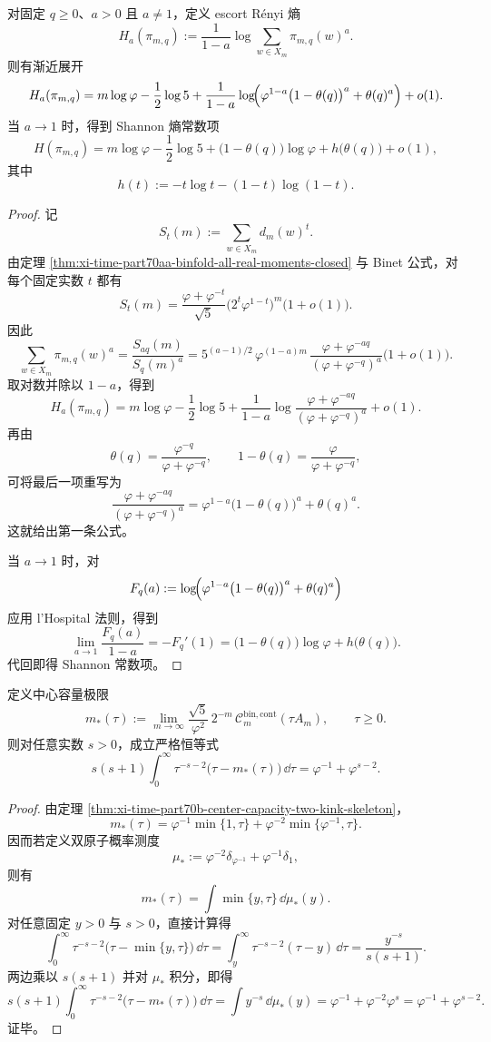 \begin{theorem}\label{thm:xi-time-part70ab-escort-renyi-entropy-full-constant}
对固定 \(q\ge 0\)、\(a>0\) 且 \(a\neq 1\)，定义 escort Rényi 熵
\[
H_a(\pi_{m,q})
:=
\frac{1}{1-a}\log\sum_{w\in X_m}\pi_{m,q}(w)^a.
\]
则有渐近展开
\[
H_a(\pi_{m,q})
=
m\log\varphi
-\frac12\log 5
+
\frac{1}{1-a}
\log\!\Bigl(
\varphi^{1-a}\bigl(1-\theta(q)\bigr)^a+\theta(q)^a
\Bigr)
+o(1).
\]
当 \(a\to 1\) 时，得到 Shannon 熵常数项
\[
H(\pi_{m,q})
=
m\log\varphi
-\frac12\log 5
+
\bigl(1-\theta(q)\bigr)\log\varphi
+
h\bigl(\theta(q)\bigr)
+o(1),
\]
其中
\[
h(t):=-t\log t-(1-t)\log(1-t).
\]
\end{theorem}
\begin{proof}
记
\[
S_t(m):=\sum_{w\in X_m} d_m(w)^t.
\]
由定理 \ref{thm:xi-time-part70aa-binfold-all-real-moments-closed} 与 Binet 公式，对每个固定实数 \(t\) 都有
\[
S_t(m)
=
\frac{\varphi+\varphi^{-t}}{\sqrt5}
\bigl(2^t\varphi^{1-t}\bigr)^m
\bigl(1+o(1)\bigr).
\]
因此
\[
\sum_{w\in X_m}\pi_{m,q}(w)^a
=
\frac{S_{aq}(m)}{S_q(m)^a}
=
5^{(a-1)/2}\,
\varphi^{(1-a)m}\,
\frac{\varphi+\varphi^{-aq}}{(\varphi+\varphi^{-q})^a}
\bigl(1+o(1)\bigr).
\]
取对数并除以 \(1-a\)，得到
\[
H_a(\pi_{m,q})
=
m\log\varphi
-\frac12\log 5
+
\frac{1}{1-a}
\log\!\frac{\varphi+\varphi^{-aq}}{(\varphi+\varphi^{-q})^a}
+o(1).
\]
再由
\[
\theta(q)=\frac{\varphi^{-q}}{\varphi+\varphi^{-q}},
\qquad
1-\theta(q)=\frac{\varphi}{\varphi+\varphi^{-q}},
\]
可将最后一项重写为
\[
\frac{\varphi+\varphi^{-aq}}{(\varphi+\varphi^{-q})^a}
=
\varphi^{1-a}\bigl(1-\theta(q)\bigr)^a+\theta(q)^a.
\]
这就给出第一条公式。

当 \(a\to 1\) 时，对
\[
F_q(a):=
\log\!\Bigl(
\varphi^{1-a}\bigl(1-\theta(q)\bigr)^a+\theta(q)^a
\Bigr)
\]
应用 l'Hospital 法则，得到
\[
\lim_{a\to 1}\frac{F_q(a)}{1-a}
=
-F_q'(1)
=
\bigl(1-\theta(q)\bigr)\log\varphi+h\bigl(\theta(q)\bigr).
\]
代回即得 Shannon 常数项。
\end{proof}

\begin{theorem}\label{thm:xi-time-part70ab-capacity-limit-negative-moment-mellin}
定义中心容量极限
\[
m_\ast(\tau):=
\lim_{m\to\infty}
\frac{\sqrt5}{\varphi^2}\,
2^{-m}\,\mathcal C_m^{\mathrm{bin,cont}}(\tau A_m),
\qquad
\tau\ge 0.
\]
则对任意实数 \(s>0\)，成立严格恒等式
\[
s(s+1)\int_0^\infty \tau^{-s-2}\bigl(\tau-m_\ast(\tau)\bigr)\,\dd\tau
=
\varphi^{-1}+\varphi^{s-2}.
\]
\end{theorem}
\begin{proof}
由定理 \ref{thm:xi-time-part70b-center-capacity-two-kink-skeleton}，
\[
m_\ast(\tau)=
\varphi^{-1}\min\{1,\tau\}
+
\varphi^{-2}\min\{\varphi^{-1},\tau\}.
\]
因而若定义双原子概率测度
\[
\mu_\ast:=\varphi^{-2}\delta_{\varphi^{-1}}+\varphi^{-1}\delta_1,
\]
则有
\[
m_\ast(\tau)=\int \min\{y,\tau\}\,\dd\mu_\ast(y).
\]
对任意固定 \(y>0\) 与 \(s>0\)，直接计算得
\[
\int_0^\infty \tau^{-s-2}\bigl(\tau-\min\{y,\tau\}\bigr)\,\dd\tau
=
\int_y^\infty \tau^{-s-2}(\tau-y)\,\dd\tau
=
\frac{y^{-s}}{s(s+1)}.
\]
两边乘以 \(s(s+1)\) 并对 \(\mu_\ast\) 积分，即得
\[
s(s+1)\int_0^\infty \tau^{-s-2}\bigl(\tau-m_\ast(\tau)\bigr)\,\dd\tau
=
\int y^{-s}\,\dd\mu_\ast(y)
=
\varphi^{-1}+\varphi^{-2}\varphi^s
=
\varphi^{-1}+\varphi^{s-2}.
\]
证毕。
\end{proof}

